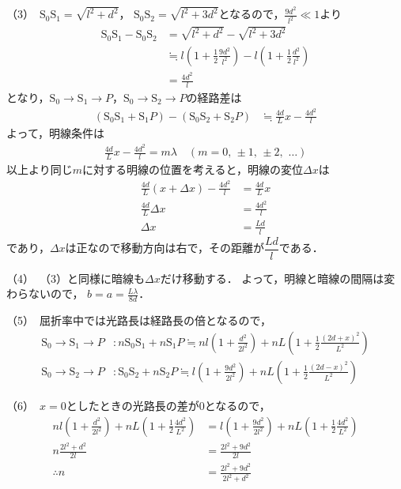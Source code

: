 \noindent （3）\,
$\text{S}_0\text{S}_1=\sqrt{l^2+d^2}$，
$\text{S}_0\text{S}_2=\sqrt{l^2+3d^2}$となるので，$\frac{9d^2}{l^2}\ll 1$より
\begin{align*}
  \text{S}_0\text{S}_1-\text{S}_0\text{S}_2 &= \sqrt{l^2+d^2} - \sqrt{l^2+3d^2}\\
  &\fallingdotseq l\left(1+\frac{1}{2}\frac{9d^2}{l^2}\right) - l\left(1+\frac{1}{2}\frac{d^2}{l^2}\right) \\
  &= \frac{4d^2}{l}
\end{align*}
となり，$\text{S}_0\to\text{S}_1\to P$，$\text{S}_0\to\text{S}_2\to P$の経路差は
\begin{align*}
  (\text{S}_0\text{S}_1+\text{S}_1P)-(\text{S}_0\text{S}_2+\text{S}_2P) &\fallingdotseq \frac{4d}{L}x-\frac{4d^2}{l}
\end{align*}
よって，明線条件は
\begin{align*}
  \frac{4d}{L}x-\frac{4d^2}{l} = m\lambda \quad (m=0,\,\pm 1,\,\pm 2,\,\,\dots)
\end{align*}
以上より同じ$m$に対する明線の位置\x を考えると，明線の変位$\Delta x$は
\begin{align*}
  \frac{4d}{L}(x+\Delta x) - \frac{4d^2}{l} &= \frac{4d}{L}x \\
  \frac{4d}{L}\Delta x &= \frac{4d^2}{l} \\
  \Delta x &= \frac{Ld}{l}
\end{align*}
であり，$\Delta x$は正なので移動方向は右で，その距離が$\dfrac{Ld}{l}$である．

\noindent （4）\,
（3）と同様に暗線も$\Delta x$だけ移動する．
よって，明線と暗線の間隔は変わらないので，
$b=a=\frac{L\lambda}{8d}$．

\noindent （5）\,
屈折率\nn 中では光路長は経路長の\nn 倍となるので，
\begin{align*}
  \text{S}_0\to\text{S}_1\to P&: n\text{S}_0\text{S}_1+n\text{S}_1P \fallingdotseq nl\left(1+\frac{d^2}{2l^2}\right) + nL \left(1+\frac{1}{2}\frac{(2d+x)^2}{L^2}\right) \\
  \text{S}_0\to\text{S}_2\to P&: \text{S}_0\text{S}_2+n\text{S}_2P \fallingdotseq l\left(1+\frac{9d^2}{2l^2}\right) + nL \left(1+\frac{1}{2}\frac{(2d-x)^2}{L^2}\right)
\end{align*}

\noindent （6）\,
$x=0$としたときの光路長の差が0となるので，
\begin{align*}
  nl\left(1+\frac{d^2}{2l^2}\right) + nL \left(1+\frac{1}{2}\frac{4d^2}{L^2}\right) &= l\left(1+\frac{9d^2}{2l^2}\right) + nL \left(1+\frac{1}{2}\frac{4d^2}{L^2}\right)\\
  n\frac{2l^2+d^2}{2l} &= \frac{2l^2+9d^2}{2l} \\
  \therefore n &= \frac{2l^2+9d^2}{2l^2+d^2}
\end{align*}

